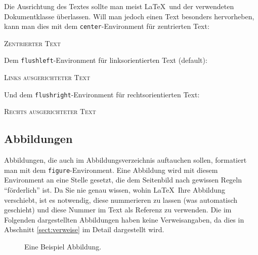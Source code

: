 Die Ausrichtung des Textes sollte man meist \LaTeX\ und der verwendeten Dokumentklasse überlassen. Will man jedoch einen Text besonders hervorheben, kann man dies mit dem \texttt{center}-Environment für zentrierten Text:

\begin{center}
\textsc{Zentrierter Text}
\end{center}

\noindent Dem \texttt{flushleft}-Environment für linksorientierten Text (default):

\begin{flushleft}
\textsc{Links ausgerichteter Text}
\end{flushleft}

\noindent Und dem \texttt{flushright}-Environment für rechtsorientierten Text:

\begin{flushright}
\textsc{Rechts ausgerichteter Text}
\end{flushright}

\subsection{Abbildungen}

Abbildungen, die auch im Abbildungsverzeichnis auftauchen sollen, formatiert man mit dem \texttt{figure}-Environment. Eine Abbildung wird mit diesem Environment an eine Stelle gesetzt, die dem Seitenbild nach gewissen Regeln "`förderlich"' ist. Da Sie nie genau wissen, wohin \LaTeX\ Ihre Abbildung verschiebt, ist es notwendig, diese nummerieren zu lassen (was automatisch geschieht) und diese Nummer im Text als Referenz zu verwenden. Die im Folgenden dargestellten Abbildungen haben keine Verweisangaben, da dies in Abschnitt \ref{sect:verweise} im Detail dargestellt wird. 

\begin{figure}[h]
\centering
{\fontsize{48}{50} \staveXI}
\caption{Eine Beispiel Abbildung.}
\end{figure}

